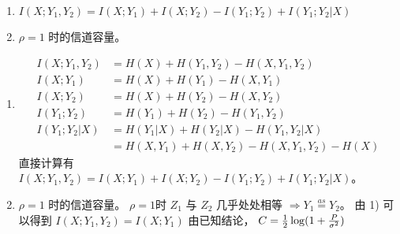 \documentclass[a4paper]{article}
\begin{document}
\begin{enumerate}[label = \arabic*]
\begin{enumerate}[label=\arabic*)]
\item $ I(X;Y_1, Y_2) = I(X; Y_1) + I(X; Y_2) - I(Y_1; Y_2) + I(Y_1; Y_2 | X) $
\item $ \rho = 1 $ 时的信道容量。
\end{enumerate}
\begin{solution}
\begin{enumerate}[label=\arabic*)]
\item
\begin{align*}
 I(X; Y_1, Y_2 ) & = H(X) + H(Y_1, Y_2) - H(X, Y_1, Y_2) \\
 I(X; Y_1) & = H(X) + H(Y_1) - H(X, Y_1) \\
 I(X; Y_2) & = H(X) + H(Y_2) - H(X, Y_2) \\
 I(Y_1; Y_2) & = H(Y_1) + H(Y_2) - H(Y_1, Y_2) \\
 I(Y_1; Y_2 | X ) & = H(Y_1 | X) + H(Y_2 | X) - H(Y_1, Y_2 | X) \\
 & = H(X, Y_1) + H(X, Y_2) - H(X, Y_1, Y_2) - H(X)
\end{align*}
直接计算有 $ I(X;Y_1, Y_2) = I(X; Y_1) + I(X; Y_2) - I(Y_1; Y_2) + I(Y_1; Y_2 | X) $。
\item $ \rho = 1 $ 时的信道容量。
$ \rho = 1 $时 $Z_1$ 与 $Z_2 $ 几乎处处相等 $ \Rightarrow Y_1 \overset{as}{=} Y_2$。
由 1) 可以得到 $ I(X; Y_1, Y_2) = I(X; Y_1) $ 由已知结论， $ C = { 1\over 2} \log (1+ { P \over \sigma^2})$
\end{enumerate}
\end{solution}
\end{enumerate}
\end{document}
